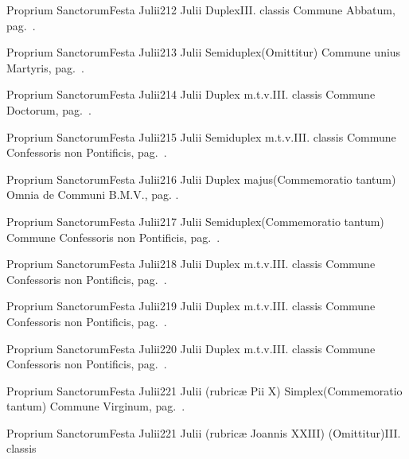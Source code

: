 \documentclass[nocturnale-romanum.tex]{subfiles}
\begin{document}
	{Proprium Sanctorum}{Festa Julii}{2}{12 Julii}
	{Duplex}{III. classis}
	{Commune Abbatum, pag.\ \pageref{M-COAB}.}
	{}

	{Proprium Sanctorum}{Festa Julii}{2}{13 Julii}
	{Semiduplex}{(Omittitur)}
	{Commune unius Martyris, pag.\ \pageref{M-UMEX}.}
	{}

	{Proprium Sanctorum}{Festa Julii}{2}{14 Julii}
	{Duplex m.t.v.}{III. classis}
	{Commune Doctorum, pag.\ \pageref{M-CODO}.}
	{}

	{Proprium Sanctorum}{Festa Julii}{2}{15 Julii}
	{Semiduplex m.t.v.}{III. classis}
	{Commune Confessoris non Pontificis, pag.\ \pageref{M-CONP}.}
	{}

	{Proprium Sanctorum}{Festa Julii}{2}{16 Julii}
	{Duplex majus}{(Commemoratio tantum)}
	{Omnia de Communi B.M.V., pag. \pageref{M-CBMV}.}
	{}

	{Proprium Sanctorum}{Festa Julii}{2}{17 Julii}
	{Semiduplex}{(Commemoratio tantum)}
	{Commune Confessoris non Pontificis, pag.\ \pageref{M-CONP}.}
	{}

	{Proprium Sanctorum}{Festa Julii}{2}{18 Julii}
	{Duplex m.t.v.}{III. classis}
	{Commune Confessoris non Pontificis, pag.\ \pageref{M-CONP}.}
	{}

	{Proprium Sanctorum}{Festa Julii}{2}{19 Julii}
	{Duplex m.t.v.}{III. classis}
	{Commune Confessoris non Pontificis, pag.\ \pageref{M-CONP}.}
	{}

	{Proprium Sanctorum}{Festa Julii}{2}{20 Julii}
	{Duplex m.t.v.}{III. classis}
	{Commune Confessoris non Pontificis, pag.\ \pageref{M-CONP}.}
	{}

	{Proprium Sanctorum}{Festa Julii}{2}{21 Julii (rubricæ Pii X)}
	{Simplex}{(Commemoratio tantum)}
	{Commune Virginum, pag.\ \pageref{M-MU}.}
	{}

	{Proprium Sanctorum}{Festa Julii}{2}{21 Julii (rubricæ Joannis XXIII)}
	{(Omittitur)}{III. classis}
	{}
	{}
\end{document}

